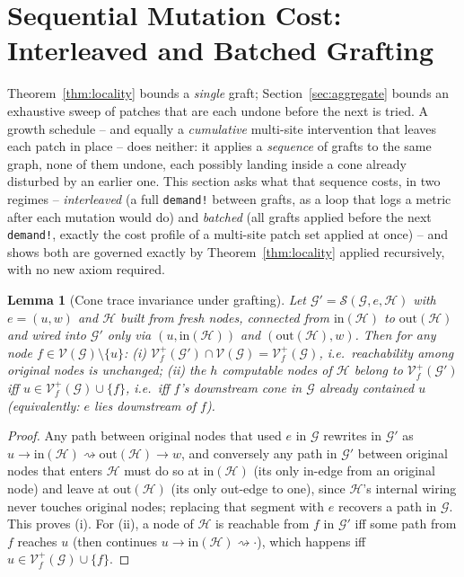 \documentclass[11pt,a4paper]{article}
\newtheorem{lemma}{Lemma}
\newcommand{\G}{\mathcal{G}}
\newcommand{\Gp}{\mathcal{G}'}
\newcommand{\Hb}{\mathcal{H}}
\newcommand{\V}{\mathcal{V}}
\newcommand{\Surg}{\mathcal{S}}
\begin{document}
\section{Sequential Mutation Cost: Interleaved and Batched Grafting}
\label{sec:sequential}

Theorem~\ref{thm:locality} bounds a \emph{single} graft; Section~\ref{sec:aggregate} bounds an
exhaustive sweep of patches that are each undone before the next is tried. A growth schedule --
and equally a \emph{cumulative} multi-site intervention that leaves each patch in place -- does
neither: it applies a \emph{sequence} of grafts to the same graph, none of them undone, each
possibly landing inside a cone already disturbed by an earlier one. This section asks what that
sequence costs, in two regimes -- \emph{interleaved} (a full \texttt{demand!} between grafts, as a
loop that logs a metric after each mutation would do) and \emph{batched} (all grafts
applied before the next \texttt{demand!}, exactly the cost profile of a multi-site patch set
applied at once) -- and shows both are governed exactly by
Theorem~\ref{thm:locality} applied recursively, with no new axiom required.

\begin{lemma}[Cone trace invariance under grafting]
\label{lem:trace-invariance}
Let $\Gp = \Surg(\G, e, \Hb)$ with $e = (u, w)$ and $\Hb$ built from fresh nodes, connected from
$\mathrm{in}(\Hb)$ to $\mathrm{out}(\Hb)$ and wired into $\Gp$ only via $(u, \mathrm{in}(\Hb))$ and
$(\mathrm{out}(\Hb), w)$. Then for any node $f \in \V(\G) \setminus \{u\}$: (i) $\V_f^{+}(\Gp) \cap
\V(\G) = \V_f^{+}(\G)$, i.e.\ reachability among original nodes is unchanged; (ii) the $h$
computable nodes of $\Hb$ belong to $\V_f^{+}(\Gp)$ iff $u \in \V_f^{+}(\G) \cup \{f\}$, i.e.\ iff
$f$'s downstream cone in $\G$ already contained $u$ (equivalently: $e$ lies downstream of $f$).
\end{lemma}

\begin{proof}
Any path between original nodes that used $e$ in $\G$ rewrites in $\Gp$ as $u \to \mathrm{in}(\Hb)
\rightsquigarrow \mathrm{out}(\Hb) \to w$, and conversely any path in $\Gp$ between original nodes
that enters $\Hb$ must do so at $\mathrm{in}(\Hb)$ (its only in-edge from an original node) and
leave at $\mathrm{out}(\Hb)$ (its only out-edge to one), since $\Hb$'s internal wiring never touches
original nodes; replacing that segment with $e$ recovers a path in $\G$. This proves (i). For (ii),
a node of $\Hb$ is reachable from $f$ in $\Gp$ iff some path from $f$ reaches $u$ (then continues
$u \to \mathrm{in}(\Hb) \rightsquigarrow \cdot$), which happens iff $u \in \V_f^+(\G) \cup \{f\}$.
\end{proof}
\end{document}

